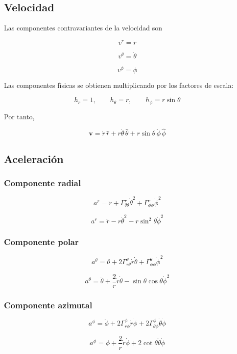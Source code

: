 \documentclass[12pt]{article}
\begin{document}
\subsection{Velocidad}

Las componentes contravariantes de la velocidad son

\[
v^r=\dot r
\]

\[
v^\theta=\dot\theta
\]

\[
v^\phi=\dot\phi
\]

Las componentes físicas se obtienen multiplicando por los factores de escala:

\[
h_r=1,
\qquad
h_\theta=r,
\qquad
h_\phi=r\sin\theta
\]

Por tanto,

\[
\boxed{
\mathbf v
=
\dot r\,\hat r
+
r\dot\theta\,\hat\theta
+
r\sin\theta\,\dot\phi\,\hat\phi
}
\]

\subsection{Aceleración}

\subsubsection*{Componente radial}

\[
a^r
=
\ddot r
+
\Gamma^r_{\theta\theta}\dot\theta^2
+
\Gamma^r_{\phi\phi}\dot\phi^2
\]

\[
a^r
=
\boxed{
\ddot r
-r\dot\theta^2
-r\sin^2\theta\dot\phi^2
}
\]

\subsubsection*{Componente polar}

\[
a^\theta
=
\ddot\theta
+
2\Gamma^\theta_{r\theta}
\dot r\dot\theta
+
\Gamma^\theta_{\phi\phi}\dot\phi^2
\]

\[
a^\theta
=
\boxed{
\ddot\theta
+
\frac{2}{r}\dot r\dot\theta
-
\sin\theta\cos\theta\dot\phi^2
}
\]

\subsubsection*{Componente azimutal}

\[
a^\phi
=
\ddot\phi
+
2\Gamma^\phi_{r\phi}\dot r\dot\phi
+
2\Gamma^\phi_{\theta\phi}
\dot\theta\dot\phi
\]

\[
a^\phi
=
\boxed{
\ddot\phi
+
\frac{2}{r}\dot r\dot\phi
+
2\cot\theta\dot\theta\dot\phi
}
\]
\end{document}
